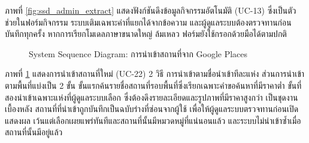 ภาพที่ \ref{fig:ssd_admin_extract} แสดงฟังก์ชันดึงข้อมูลกิจกรรมอัตโนมัติ (UC-13) ซึ่งเป็นตัวช่วยในฟอร์มกิจกรรม ระบบเติมเฉพาะค่าที่แยกได้จากข้อความ และผู้ดูแลระบบต้องตรวจทานก่อนบันทึกทุกครั้ง หากการเรียกโมเดลภาษาขนาดใหญ่ ล้มเหลว ฟอร์มยังใช้กรอกด้วยมือได้ตามปกติ

\begin{figure}[H]
\centering
{}
\caption{System Sequence Diagram: การนำเข้าสถานที่จาก Google Places}
\label{fig:ssd_admin_import}
\end{figure}

ภาพที่ \ref{fig:ssd_admin_import} แสดงการนำเข้าสถานที่ใหม่ (UC-22) 2 วิธี การนำเข้าตามชื่อนำเข้าทีละแห่ง ส่วนการนำเข้าตามพื้นที่แบ่งเป็น 2 ขั้น ขั้นแรกค้นรายชื่อสถานที่รอบพื้นที่ซึ่งเรียกเฉพาะคำขอค้นหาที่มีราคาต่ำ ขั้นที่สองนำเข้าเฉพาะแห่งที่ผู้ดูแลระบบเลือก ซึ่งต้องดึงรายละเอียดและรูปภาพที่มีราคาสูงกว่า เป็นชุดงานเบื้องหลัง สถานที่ที่นำเข้าถูกบันทึกเป็นฉบับร่างที่ซ่อนจากผู้ใช้ เพื่อให้ผู้ดูแลระบบตรวจทานก่อนเปิดแสดงผล เว้นแต่เลือกเผยแพร่ทันทีและสถานที่นั้นมีหมวดหมู่ที่แน่นอนแล้ว และระบบไม่นำเข้าซ้ำเมื่อสถานที่นั้นมีอยู่แล้ว

